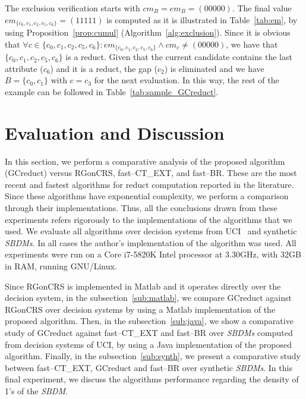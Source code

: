 \documentclass[number,preprint,review,12pt]{elsarticle}
\begin{document}
	The exclusion verification starts with $cm_B = em_B = (00000)$. The final value $em_{\lbrace c_0,c_1,c_2,c_5,c_6\rbrace}=(11111)$ is computed as it is illustrated in Table~\ref{tab:em}, by using Proposition~\ref{prop:cumul} (Algorithm~\ref{alg:exclusion}). Since it is obvious that $\forall c \in \lbrace c_0,c_1,c_2,c_5,c_6\rbrace : em_{\lbrace c_0,c_1,c_2,c_5,c_6\rbrace}\wedge cm_c \neq (00000)$, we have that $\lbrace c_0,c_1,c_2,c_5,c_6\rbrace$ is a reduct. Given that the current candidate contains the last attribute ($c_6$) and it is a reduct, the gap ($c_2$) is eliminated and we have $B = \lbrace c_0,c_1\rbrace$ with $c=c_3$ for the next evaluation. In this way, the rest of the example can be followed in Table~\ref{tab:sample_GCreduct}.

	
%
\section{Evaluation and Discussion}\label{evaluation}
	In this section, we perform a comparative analysis of the proposed algorithm (GCreduct) versus RGonCRS, fast--CT\_EXT, and fast--BR. These are the most recent and fastest algorithms for reduct computation reported in the literature. Since these algorithms have exponential complexity, we perform a comparison through their implementations. Thus, all the conclusions drawn from these experiments refers rigorously to the implementations of the algorithms that we used. We evaluate all algorithms over decision systems from UCI~\cite{Bache13} and synthetic \textit{SBDMs}. In all cases the author's implementation of the algorithm was used. All experiments were run on a Core i7-5820K Intel processor at 3.30GHz, with 32GB in RAM, running GNU/Linux.\label{par:implementation}
	
	Since RGonCRS is implemented in Matlab and it operates directly	over the decision system, in the subsection~\ref{sub:matlab}, we compare GCreduct against RGonCRS over decision systems by using a Matlab implementation of the proposed algorithm. Then, in the subsection~\ref{sub:java}, we show a comparative study of GCreduct against fast--CT\_EXT and fast--BR over \textit{SBDMs} computed from decision systems of UCI, by using a Java implementation of the proposed algorithm. Finally, in the subsection~\ref{sub:synth}, we present a comparative study between fast--CT\_EXT, GCreduct and fast--BR over synthetic \textit{SBDMs}. In this final experiment, we discuss the algorithms performance regarding the density of 1's of the \textit{SBDM}. 
	
\end{document}
